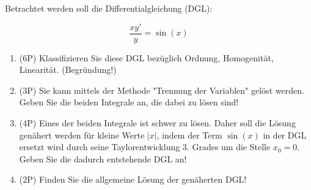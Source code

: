 \item Betrachtet werden soll die Differentialgleichung (DGL):

$$\frac{xy'}{y} = \sin(x)$$

\begin{enumerate}
\item (6P) Klassifizieren Sie diese DGL bezüglich Ordnung, Homogenität, Linearität. (Begründung!)
\item (3P) Sie kann mittels der Methode "Trennung der Variablen" gelöst werden. Geben Sie die beiden Integrale an, die dabei zu lösen sind!
\item (4P) Eines der beiden Integrale ist schwer zu lösen. Daher soll die Lösung genähert werden für kleine Werte $|x|$, indem der Term $\sin(x)$ in der DGL ersetzt wird durch seine Taylorentwicklung 3. Grades um die Stelle $x_0=0$. Geben Sie die dadurch entstehende DGL an!
\item (2P) Finden Sie die allgemeine Lösung der genäherten DGL!
\end{enumerate}

